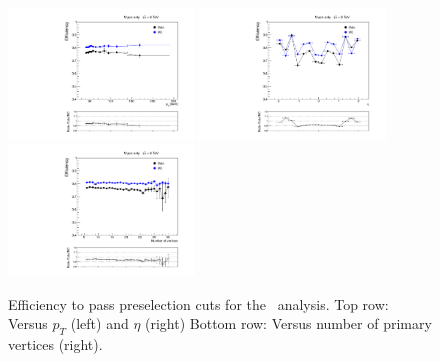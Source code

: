 \begin{figure}
 \begin{center}
  \includegraphics[clip=false, trim=0.0cm 0cm 0cm 0cm, width=0.44\textwidth]{figures/muonly/pteff_Comp}
  \includegraphics[clip=false, trim=0.0cm 0cm 0cm 0cm, width=0.44\textwidth]{figures/muonly/etaeff_Comp}
  \includegraphics[clip=false, trim=0.0cm 0cm 0cm 0cm, width=0.44\textwidth]{figures/muonly/PVeff_Comp}
 \end{center}
 \caption[Efficiency to pass preselection cuts for the \muononly\ analysis versus \pt, $\eta$, and number of primary vertices]
{Efficiency to pass preselection cuts for the \muononly\ analysis.
Top row: Versus $p_T$ (left) and $\eta$ (right)
Bottom row: Versus number of primary vertices (right).}
   \label{fig:MuOnlyTagProbeEff}
\end{figure}